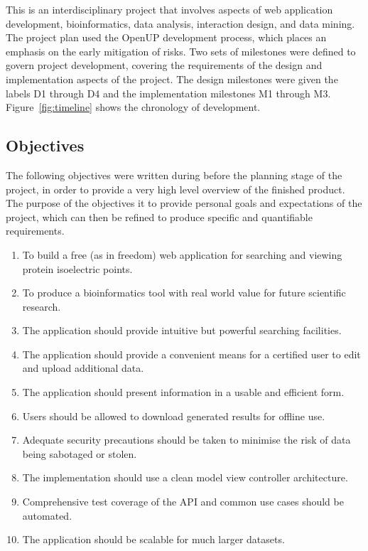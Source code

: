 This is an interdisciplinary project that involves aspects of web
application development, bioinformatics, data analysis, interaction
design, and data mining. The project plan used the OpenUP development
process, which places an emphasis on the early mitigation of
risks. Two sets of milestones were defined to govern project
development, covering the requirements of the design and
implementation aspects of the project. The design milestones were
given the labels D1 through D4 and the implementation milestones M1
through M3. Figure~\ref{fig:timeline} shows the chronology of
development.

\newpage
\begin{multicols}{2}

\section*{Objectives}\label{sec:objectives}
The following objectives were written during before the planning stage
of the project, in order to provide a very high level overview of the
finished product. The purpose of the objectives it to provide personal
goals and expectations of the project, which can then be refined to
produce specific and quantifiable requirements.

\begin{enumerate}
\item To build a free (as in freedom) web application for searching
  and viewing protein isoelectric points.
\item To produce a bioinformatics tool with real world value for
  future scientific research.
\item The application should provide intuitive but powerful searching
  facilities.
\item The application should provide a convenient means for a
  certified user to edit and upload additional data.
\item The application should present information in a usable and
  efficient form.
\item Users should be allowed to download generated results for
  offline use.
\item Adequate security precautions should be taken to minimise the
  risk of data being sabotaged or stolen.
\item The implementation should use a clean model view controller
  architecture.
\item Comprehensive test coverage of the API and common use cases
  should be automated.
\item The application should be scalable for much larger datasets.
\end{enumerate}


\end{multicols}
